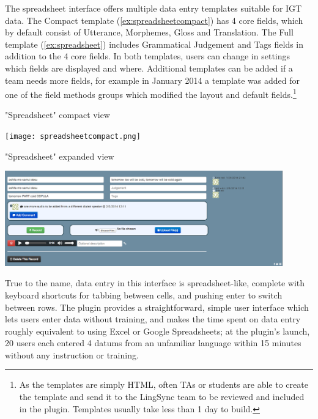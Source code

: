\documentclass[letterpaper, 12pt, dvips]{mitwpl}
\begin{document}
 The spreadsheet interface offers multiple data entry templates suitable for IGT data. The Compact template (\ref{ex:spreadsheetcompact}) has 4 core fields, which by default consist of Utterance, Morphemes, Gloss and Translation. The Full template  (\ref{ex:spreadsheet}) includes Grammatical Judgement and Tags fields in addition to the 4 core fields. In both templates, users can change in settings which fields are displayed and where. Additional templates can be added if a team needs more fields, for example in January 2014 a template was added for one of the field methods groups which modified the layout and default fields.\footnote{As the templates are simply HTML, often TAs or students are able to create the template and send it to the LingSync team to be reviewed and included in the plugin. Templates usually take less than 1 day to build.} 
 
 \begin{exe} 
\ex "Spreadsheet" compact view \\

 \begin{center}
   \texttt{[image: spreadsheetcompact.png]}
 \end{center}
 
\label{ex:spreadsheetcompact}
\end{exe} 

 
\begin{exe} 
\ex "Spreadsheet" expanded view\\

  \begin{center}
   \includegraphics[width=0.9\textwidth]{spreadsheetinterface.png}
   \end{center}

\label{ex:spreadsheet}
\end{exe} 

True to the name, data entry in this interface is spreadsheet-like, complete with keyboard shortcuts for tabbing between cells, and pushing enter to switch between rows.  The plugin provides a straightforward, simple user interface which lets users enter data without training, and makes the time spent on data entry roughly equivalent to using Excel or Google Spreadsheets; at the plugin's launch, 20 users each entered 4 datums from an unfamiliar language within 15 minutes without any instruction or training.  
\end{document}
